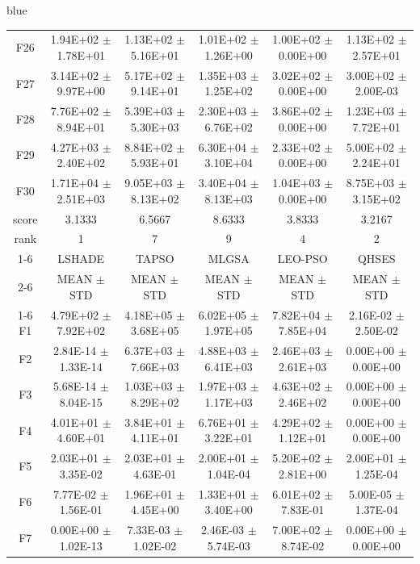 \documentclass[journal, onecolumn]{IEEEtran}
\begin{document}
\begin{color}{blue}
\begin{table}[htbp!]
\begin{tabular}{c|ccccc}
		F26	 &	1.94E+02	$\pm$	1.78E+01	 &	1.13E+02	$\pm$	5.16E+01		 &	1.01E+02	$\pm$	1.26E+00		 &	1.00E+02	$\pm$	0.00E+00		 &	1.13E+02	$\pm$	2.57E+01	\\		
		F27	 &	3.14E+02	$\pm$	9.97E+00	 &	5.17E+02	$\pm$	9.14E+01		 &	1.35E+03	$\pm$	1.25E+02		 &	3.02E+02	$\pm$	0.00E+00		 &	3.00E+02	$\pm$	2.00E-03	\\		
		F28	 &	7.76E+02	$\pm$	8.94E+01	 &	5.39E+03	$\pm$	5.30E+03		 &	2.30E+03	$\pm$	6.76E+02		 &	3.86E+02	$\pm$	0.00E+00		 &	1.23E+03	$\pm$	7.72E+01	\\		
		F29	 &	4.27E+03	$\pm$	2.40E+02	 &	8.84E+02	$\pm$	5.93E+01		 &	6.30E+04	$\pm$	3.10E+04		 &	2.33E+02	$\pm$	0.00E+00		 &	5.00E+02	$\pm$	2.24E+01	\\		
		F30	 &	1.71E+04	$\pm$	2.51E+03	 &	9.05E+03	$\pm$	8.13E+02		 &	3.40E+04	$\pm$	8.13E+03		 &	1.04E+03	$\pm$	0.00E+00		 &	8.75E+03	$\pm$	3.15E+02	\\		\hline
		score		& 3.1333 & 6.5667 & 8.6333 & 3.8333 & 3.2167											\\													
		rank	 	& 1 & 7 & 9 & 4 & 2											\\	\cline{1-6}												
		&	LSHADE				 &	TAPSO				 &	MLGSA				 &	LEO-PSO				 &	QHSES			\\\cline{2-6}	
		&	MEAN	$\pm$	STD		 &	MEAN	$\pm$	STD		 &	MEAN	$\pm$	STD		 &	MEAN	$\pm$	STD		 &	MEAN	$\pm$	STD	\\	\cline{1-6}
		F1	 &	4.79E+02	$\pm$	7.92E+02		 &	4.18E+05	$\pm$	3.68E+05		 &	6.02E+05	$\pm$	1.97E+05		 &	7.82E+04	$\pm$	7.85E+04		 &	2.16E-02	$\pm$	2.50E-02	\\	
		F2	 &	2.84E-14	$\pm$	1.33E-14		 &	6.37E+03	$\pm$	7.66E+03		 &	4.88E+03	$\pm$	6.41E+03		 &	2.46E+03	$\pm$	2.61E+03		 &	0.00E+00	$\pm$	0.00E+00	\\	
		F3	 &	5.68E-14	$\pm$	8.04E-15		 &	1.03E+03	$\pm$	8.29E+02		 &	1.97E+03	$\pm$	1.17E+03		 &	4.63E+02	$\pm$	2.46E+02		 &	0.00E+00	$\pm$	0.00E+00	\\	
		F4	 &	4.01E+01	$\pm$	4.60E+01		 &	3.84E+01	$\pm$	4.11E+01		 &	6.76E+01	$\pm$	3.22E+01		 &	4.29E+02	$\pm$	1.12E+01		 &	0.00E+00	$\pm$	0.00E+00	\\	
		F5	 &	2.03E+01	$\pm$	3.35E-02		 &	2.03E+01	$\pm$	4.63E-01		 &	2.00E+01	$\pm$	1.04E-04		 &	5.20E+02	$\pm$	2.81E+00		 &	2.00E+01	$\pm$	1.25E-04	\\	
		F6	 &	7.77E-02	$\pm$	1.56E-01		 &	1.96E+01	$\pm$	4.45E+00		 &	1.33E+01	$\pm$	3.40E+00		 &	6.01E+02	$\pm$	7.83E-01		 &	5.00E-05	$\pm$	1.37E-04	\\	
		F7	 &	0.00E+00	$\pm$	1.02E-13		 &	7.33E-03	$\pm$	1.02E-02		 &	2.46E-03	$\pm$	5.74E-03		 &	7.00E+02	$\pm$	8.74E-02		 &	0.00E+00	$\pm$	0.00E+00	\\	

\end{tabular}
\end{table}
\end{color}
\end{document}
